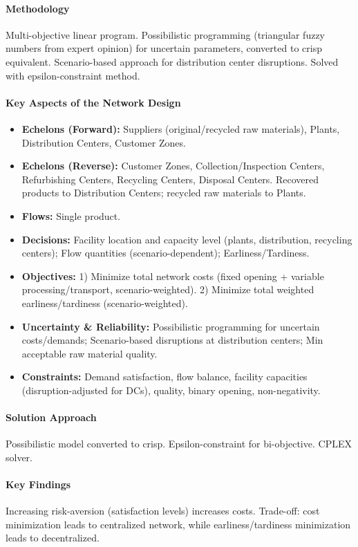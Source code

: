 \paragraph{Methodology} Multi-objective linear program. Possibilistic programming (triangular fuzzy numbers from expert opinion) for uncertain parameters, converted to crisp equivalent. Scenario-based approach for distribution center disruptions. Solved with epsilon-constraint method.
\paragraph{Key Aspects of the Network Design}
\begin{itemize}
    \item \textbf{Echelons (Forward):} Suppliers (original/recycled raw materials), Plants, Distribution Centers, Customer Zones.
    \item \textbf{Echelons (Reverse):} Customer Zones, Collection/Inspection Centers, Refurbishing Centers, Recycling Centers, Disposal Centers. Recovered products to Distribution Centers; recycled raw materials to Plants.
    \item \textbf{Flows:} Single product.
    \item \textbf{Decisions:} Facility location and capacity level (plants, distribution, recycling centers); Flow quantities (scenario-dependent); Earliness/Tardiness.
    \item \textbf{Objectives:} 1) Minimize total network costs (fixed opening + variable processing/transport, scenario-weighted). 2) Minimize total weighted earliness/tardiness (scenario-weighted).
    \item \textbf{Uncertainty \& Reliability:} Possibilistic programming for uncertain costs/demands; Scenario-based disruptions at distribution centers; Min acceptable raw material quality.
    \item \textbf{Constraints:} Demand satisfaction, flow balance, facility capacities (disruption-adjusted for DCs), quality, binary opening, non-negativity.
\end{itemize}
\paragraph{Solution Approach} Possibilistic model converted to crisp. Epsilon-constraint for bi-objective. CPLEX solver.
\paragraph{Key Findings} Increasing risk-aversion (satisfaction levels) increases costs. Trade-off: cost minimization leads to centralized network, while earliness/tardiness minimization leads to decentralized.
